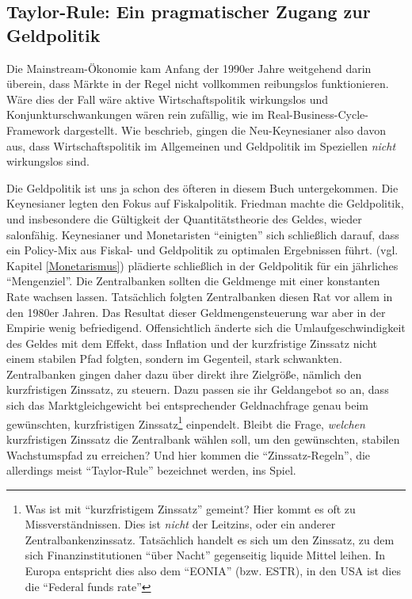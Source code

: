 \subsection{Taylor-Rule: Ein pragmatischer Zugang zur Geldpolitik}
Die Mainstream-Ökonomie kam Anfang der 1990er Jahre weitgehend darin überein, dass Märkte in der Regel nicht vollkommen reibungslos funktionieren. Wäre dies der Fall wäre aktive Wirtschaftspolitik wirkungslos und Konjunkturschwankungen wären rein zufällig, wie im Real-Business-Cycle-Framework dargestellt. Wie \textcite[S. 823]{Akerlof1985} beschrieb, gingen die Neu-Keynesianer also davon aus, dass Wirtschaftspolitik im Allgemeinen und Geldpolitik im Speziellen \textit{nicht} wirkungslos sind.

Die Geldpolitik ist uns ja schon des öfteren in diesem Buch untergekommen. Die Keynesianer legten den Fokus auf Fiskalpolitik. Friedman machte die Geldpolitik, und insbesondere die Gültigkeit der Quantitätstheorie des Geldes, wieder salonfähig. Keynesianer und Monetaristen "`einigten"' sich schließlich darauf, dass ein Policy-Mix aus Fiskal- und Geldpolitik zu optimalen Ergebnissen führt. \textcite{Friedman1960} (vgl. Kapitel \ref{Monetarismus}) plädierte schließlich in der Geldpolitik für ein jährliches "`Mengenziel"'. Die Zentralbanken sollten die Geldmenge mit einer konstanten Rate wachsen lassen. Tatsächlich folgten Zentralbanken diesen Rat vor allem in den 1980er Jahren. Das Resultat dieser Geldmengensteuerung war aber in der Empirie wenig befriedigend. Offensichtlich änderte sich die Umlaufgeschwindigkeit des Geldes mit dem Effekt, dass Inflation und der kurzfristige Zinssatz nicht einem stabilen Pfad folgten, sondern im Gegenteil, stark schwankten. Zentralbanken gingen daher dazu über direkt ihre Zielgröße, nämlich den kurzfristigen Zinssatz, zu steuern. Dazu passen sie ihr Geldangebot so an, dass sich das Marktgleichgewicht bei entsprechender Geldnachfrage genau beim gewünschten, kurzfristigen Zinssatz\footnote{Was ist mit "`kurzfristigem Zinssatz"' gemeint? Hier kommt es oft zu Missverständnissen. Dies ist \textit{nicht} der Leitzins, oder ein anderer Zentralbankenzinssatz. Tatsächlich handelt es sich um den Zinssatz, zu dem sich Finanzinstitutionen "`über Nacht"' gegenseitig liquide Mittel leihen. In Europa entspricht dies also dem "`EONIA"' (bzw. ESTR), in den USA ist dies die "`Federal funds rate"'} einpendelt. Bleibt die Frage, \textit{welchen} kurzfristigen Zinssatz die Zentralbank wählen soll, um den gewünschten, stabilen Wachstumspfad zu erreichen? Und hier kommen die "`Zinssatz-Regeln"', die allerdings meist "`Taylor-Rule"' bezeichnet werden, ins Spiel.

